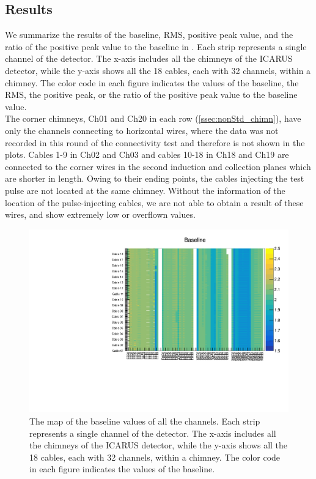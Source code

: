 \subsection{Results}
\label{sec:results}

We summarize the results of the baseline, RMS, positive peak value, 
and the ratio of the positive peak value to the baseline in 
.
Each strip represents a single channel of the detector.
The x-axis includes all the chimneys of the ICARUS detector, while
the y-axis shows all the 18 cables, each with 32 channels, within a chimney.
The color code in each figure indicates the values of the baseline, the RMS,
the positive peak, or the ratio of the positive peak value to
the baseline value.\\

The corner chimneys, Ch01 and Ch20 in each row (\cref{ssec:nonStd_chimn}),
have only the channels
connecting to horizontal wires, where the data was not recorded in this
round of the connectivity test and therefore is not shown in the plots.
Cables 1-9 in Ch02 and Ch03 and cables 10-18 in Ch18 and Ch19 are connected
to the corner wires in the second induction and collection planes which are
shorter in length.
Owing to their ending points, the cables injecting the test pulse are
not located at the same chimney.
Without the information of the location of the pulse-injecting cables,
we are not able to obtain a result of these wires, and 
 show extremely low or
overflown values.\\


\begin{figure}
\centering
\includegraphics[width=\textwidth]{fig/Baseline.pdf}
\caption{The map of the baseline values of all the channels.
Each strip represents a single channel of the detector.
The x-axis includes all the chimneys of the ICARUS detector, while
the y-axis shows all the 18 cables, each with 32 channels, within a chimney.
The color code in each figure indicates the values of the baseline.}
\label{fig:baseline}
\end{figure}

